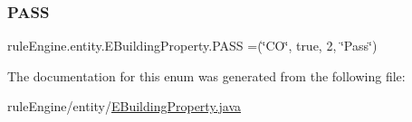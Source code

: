 \subsubsection{\texorpdfstring{P\+A\+SS}{PASS}}
{\footnotesize\ttfamily rule\+Engine.\+entity.\+E\+Building\+Property.\+P\+A\+SS =(\char`\"{}CO\char`\"{}, true, 2, \char`\"{}Pass\char`\"{})}



The documentation for this enum was generated from the following file\+:\begin{DoxyCompactItemize}
\item 
rule\+Engine/entity/\mbox{\hyperlink{_e_building_property_8java}{E\+Building\+Property.\+java}}\end{DoxyCompactItemize}
